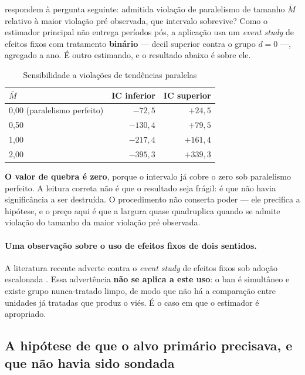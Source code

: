 \citet{rambachan2023credible} respondem à pergunta seguinte: admitida violação
de paralelismo de tamanho \(\bar{M}\) relativo à maior violação pré observada,
que intervalo sobrevive? Como o estimador principal não entrega períodos pós, a
aplicação usa um \emph{event study} de efeitos fixos com tratamento
\textbf{binário} --- decil superior contra o grupo \(d = 0\) ---, agregado a
ano. É outro estimando, e o resultado abaixo é sobre ele.

\begin{table}[htbp]
\centering
\caption{Sensibilidade a violações de tendências paralelas}
\label{tab:honestdid}
\small
\begin{tabular}{lrr}
\toprule
\(\bar{M}\) & \textbf{IC inferior} & \textbf{IC superior} \\
\midrule
0{,}00 (paralelismo perfeito) & \(-72{,}5\) & \(+24{,}5\) \\
0{,}50 & \(-130{,}4\) & \(+79{,}5\) \\
1{,}00 & \(-217{,}4\) & \(+161{,}4\) \\
2{,}00 & \(-395{,}3\) & \(+339{,}3\) \\
\bottomrule
\end{tabular}
\end{table}

\textbf{O valor de quebra é zero}, porque o intervalo já cobre o zero sob
paralelismo perfeito. A leitura correta não é que o resultado seja frágil: é que
não havia significância a ser destruída. O procedimento não conserta poder ---
ele precifica a hipótese, e o preço aqui é que a largura quase quadruplica
quando se admite violação do tamanho da maior violação pré observada.

\paragraph{Uma observação sobre o uso de efeitos fixos de dois sentidos.}
A literatura recente adverte contra o \emph{event study} de efeitos fixos sob
adoção escalonada \citep{goodmanbacon2021,sunabraham2021}. Essa advertência
\textbf{não se aplica a este uso}: o ban é simultâneo e existe grupo
nunca-tratado limpo, de modo que não há a comparação entre unidades já tratadas
que produz o viés. É o caso em que o estimador é apropriado.

\subsection{A hipótese de que o alvo primário precisava, e que não havia sido
sondada}
\label{sub:spt}

